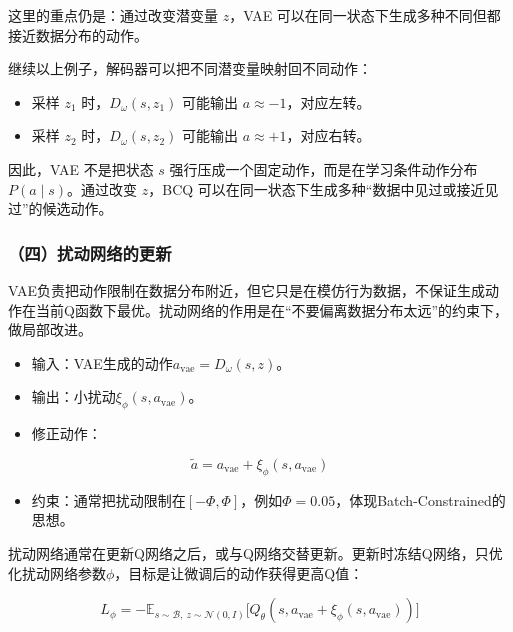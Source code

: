 这里的重点仍是：通过改变潜变量 \(z\)，VAE 可以在同一状态下生成多种不同但都接近数据分布的动作。

继续以上例子，解码器可以把不同潜变量映射回不同动作：

\begin{itemize}
\tightlist
\item
  采样 \(z_1\) 时，\(D_\omega(s,z_1)\) 可能输出 \(a\approx -1\)，对应左转。
\item
  采样 \(z_2\) 时，\(D_\omega(s,z_2)\) 可能输出 \(a\approx +1\)，对应右转。
\end{itemize}

因此，VAE 不是把状态 \(s\) 强行压成一个固定动作，而是在学习条件动作分布 \(P(a\mid s)\)。通过改变 \(z\)，BCQ 可以在同一状态下生成多种``数据中见过或接近见过''的候选动作。

\hypertarget{ux56dbux6270ux52a8ux7f51ux7edcux7684ux66f4ux65b0}{%
\subsubsection{（四）扰动网络的更新}\label{ux56dbux6270ux52a8ux7f51ux7edcux7684ux66f4ux65b0}}

VAE负责把动作限制在数据分布附近，但它只是在模仿行为数据，不保证生成动作在当前Q函数下最优。扰动网络的作用是在``不要偏离数据分布太远''的约束下，做局部改进。

\begin{itemize}
\tightlist
\item
  输入：VAE生成的动作\(a_{\mathrm{vae}}=D_\omega(s,z)\)。
\item
  输出：小扰动\(\xi_\phi(s,a_{\mathrm{vae}})\)。
\item
{}
  修正动作：
\end{itemize}

\[
\tilde a = a_{\mathrm{vae}}+\xi_\phi(s,a_{\mathrm{vae}})
\]

\begin{itemize}
\tightlist
\item
  约束：通常把扰动限制在\([-\Phi,\Phi]\)，例如\(\Phi=0.05\)，体现Batch-Constrained的思想。
\end{itemize}

扰动网络通常在更新Q网络之后，或与Q网络交替更新。更新时冻结Q网络，只优化扰动网络参数\(\phi\)，目标是让微调后的动作获得更高Q值：

\[
L_\phi
=-\mathbb{E}_{s\sim\mathcal B,\ z\sim\mathcal{N}(0,I)}
\bigl[
Q_\theta(s,a_{\mathrm{vae}}+\xi_\phi(s,a_{\mathrm{vae}}))
\bigr]
\]

